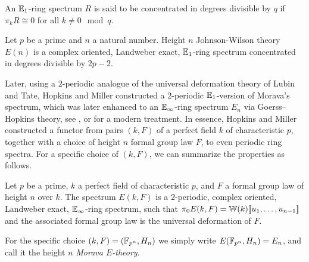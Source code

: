 \begin{definition}
    An $\mathbb{E}_1$-ring spectrum $R$ is said to be concentrated in degrees divisible by $q$ if $\pi_k R \cong 0$ for all $k \not = 0 \mod q$. 
\end{definition}

\begin{proposition}
    \label{ch0:prop:Johnson-Wilson-properties}
    Let $p$ be a prime and $n$ a natural number. Height $n$ Johnson-Wilson theory $E(n)$ is a complex oriented, Landweber exact, $\mathbb{E}_1$-ring spectrum concentrated in degrees divisible by $2p-2$. 
\end{proposition}

Later, using a $2$-periodic analogue of the universal deformation theory of Lubin and Tate, Hopkins and Miller constructed a $2$-periodic $\mathbb{E}_1$-version of Morava's spectrum, which was later enhanced to an $\mathbb{E}_\infty$-ring spectrum $E_n$ via Goerss--Hopkins theory, see \cite{goerss-hopkins_04}, or \cite{pstragowski_vankoughnett_2022} for a modern treatment. In essence, Hopkins and Miller constructed a functor from pairs $(k, F)$ of a perfect field $k$ of characteristic $p$, together with a choice of height $n$ formal group law $F$, to even periodic ring spectra. For a specific choice of $(k, F)$, we can summarize the properties as follows.  

\begin{proposition}
    Let $p$ be a prime, $k$ a perfect field of characteristic $p$, and $F$ a formal group law of height $n$ over $k$. The spectrum $E(k,F)$ is a $2$-periodic, complex oriented, Landweber exact, $\mathbb{E}_\infty$-ring spectrum, such that $\pi_0 E(k,F)=\mathbb{W}(k)[\![ u_1, \ldots, u_{n-1}]\!]$ and the associated formal group law is the universal deformation of $F$. 
\end{proposition}




\begin{definition}
    For the specific choice $(k,F) = (\mathbb{F}_{p^n}, H_n)$ we simply write $E(\mathbb{F}_{p^n}, H_n) = E_n$, and call it the height $n$ \emph{Morava $E$-theory}. 
\end{definition}

